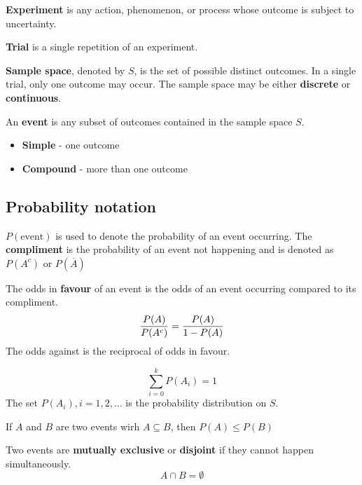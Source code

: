 \documentclass[english, 12pt]{article}
\begin{document}
\begin{defn}
\textbf{Experiment} is any action, phenomenon, or process whose outcome is subject to uncertainty.
\end{defn}

\begin{defn}
\textbf{Trial} is a single repetition of an experiment.
\end{defn}

\begin{defn}
\textbf{Sample space}, denoted by $S$, is the set of possible distinct outcomes. In a single trial, only one outcome may occur. The sample space may be either \textbf{discrete} or \textbf{continuous}.
\end{defn}

\begin{defn}
An \textbf{event} is any subset of outcomes contained in the sample space $S$.
\begin{itemize}
\item \textbf{Simple} - one outcome
\item \textbf{Compound} - more than one outcome
\end{itemize}
\end{defn}

\subsection*{Probability notation}
$P(\text{event})$ is used to denote the probability of an event occurring. The \textbf{compliment} is the probability of an event not happening and is denoted as $P(A^c)$ or $P(\overline{A})$
\begin{defn}
The odds in \textbf{favour} of an event is the odds of an event occurring compared to its compliment.
\[\frac{P(A)}{P(A^c)} = \frac{P(A)}{1-P(A)}\]
The odds against is the reciprocal of odds in favour.
\end{defn}

\begin{thrm}
\[\sum_{i=0}^k P(A_{i}) = 1\]
The set $P(A_{i}), i = 1,2,\dots$ is the probability distribution on $S$.
\end{thrm}

\begin{thrm}
If $A$ and $B$ are two events wirh $A \subseteq B$, then $P(A) \leq P(B)$
\end{thrm}

\begin{defn}
Two events are \textbf{mutually exclusive} or \textbf{disjoint} if they cannot happen simultaneously.
\[A \cap B = \emptyset \]
\end{defn}
\tabularnewline
\end{document}
